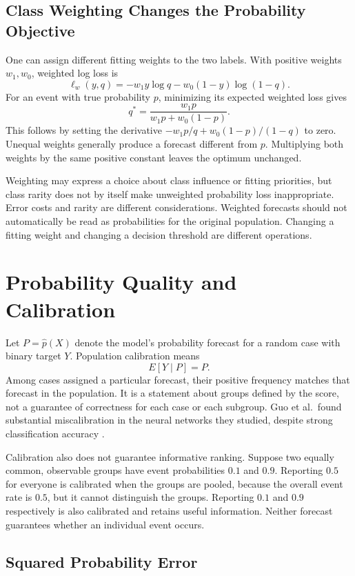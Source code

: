 \subsection{Class Weighting Changes the Probability Objective}

One can assign different fitting weights to the two labels. With positive weights $w_1,w_0$, weighted log loss is
\[
\ell_w(y,q)=-w_1y\log q-w_0(1-y)\log(1-q).
\]
For an event with true probability $p$, minimizing its expected weighted loss gives
\[
q^*=\frac{w_1p}{w_1p+w_0(1-p)}.
\]
This follows by setting the derivative $-w_1p/q+w_0(1-p)/(1-q)$ to zero. Unequal weights generally produce a forecast different from $p$. Multiplying both weights by the same positive constant leaves the optimum unchanged.

Weighting may express a choice about class influence or fitting priorities, but class rarity does not by itself make unweighted probability loss inappropriate. Error costs and rarity are different considerations. Weighted forecasts should not automatically be read as probabilities for the original population. Changing a fitting weight and changing a decision threshold are different operations.

\section{Probability Quality and Calibration}

Let $P=\hat p(X)$ denote the model's probability forecast for a random case with binary target $Y$. Population calibration means
\[
E[Y\mid P]=P.
\]
Among cases assigned a particular forecast, their positive frequency matches that forecast in the population. It is a statement about groups defined by the score, not a guarantee of correctness for each case or each subgroup. Guo et al.\ found substantial miscalibration in the neural networks they studied, despite strong classification accuracy \citep{guo2017}.

Calibration also does not guarantee informative ranking. Suppose two equally common, observable groups have event probabilities $0.1$ and $0.9$. Reporting $0.5$ for everyone is calibrated when the groups are pooled, because the overall event rate is $0.5$, but it cannot distinguish the groups. Reporting $0.1$ and $0.9$ respectively is also calibrated and retains useful information. Neither forecast guarantees whether an individual event occurs.

\subsection{Squared Probability Error}

